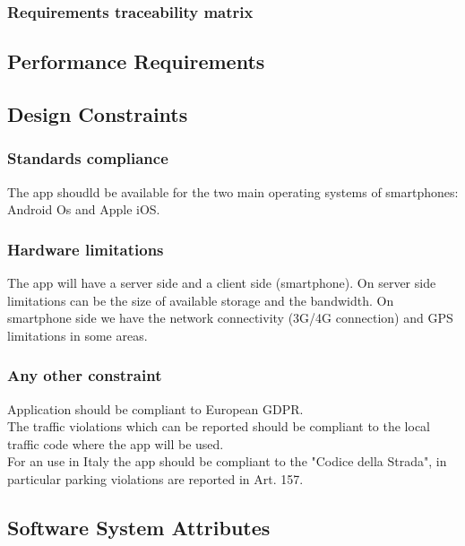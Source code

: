 \subsubsection{Requirements traceability matrix}




\subsection{Performance Requirements}

\subsection{Design Constraints}%

\subsubsection{Standards compliance}
The app shoudld be available for the two main operating systems of smartphones: Android Os and Apple iOS.\\



\subsubsection{Hardware limitations}
The app will have a server side and a client side (smartphone).
On server side limitations can be the size of available storage and the bandwidth.
On smartphone side we have the network connectivity (3G/4G connection) and GPS limitations in some areas.

\subsubsection{Any other constraint}
Application should be compliant to European GDPR.\\
The traffic violations which can be reported should be compliant to the local traffic code where the app will be used.\\
For an use in Italy the app should be compliant to the "Codice della Strada", in particular parking violations are reported in Art. 157.\\

\subsection{Software System Attributes}
